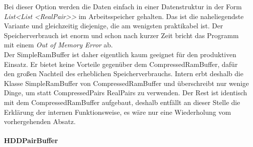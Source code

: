\documentclass[12pt,a4paper]{article}
\begin{document}
Bei dieser Option werden die Daten einfach in einer Datenstruktur in der Form \textit{List<List <RealPair>>} im Arbeitsspeicher gehalten. Das ist die naheliegendste Variante und gleichzeitig diejenige, die am wenigsten praktikabel ist. Der Speicherverbrauch ist enorm und schon nach kurzer Zeit bricht das Programm mit einem \textit{Out of Memory Error} ab. \\
Der SimpleRamBuffer ist daher eigentlich kaum geeignet für den produktiven Einsatz. Er bietet keine Vorteile gegenüber dem CompressedRamBuffer, dafür den großen Nachteil des erheblichen Speicherverbrauchs. Intern erbt deshalb die Klasse SimpleRamBuffer von CompressedRamBuffer und überschreibt nur wenige Dinge, um statt CompressedPairs RealPairs zu verwenden. Der Rest ist identisch mit dem CompressedRamBuffer aufgebaut, deshalb entfällt an dieser Stelle die Erklärung der internen Funktionsweise, es wäre nur eine Wiederholung vom vorhergehenden Absatz. \\



\paragraph{HDDPairBuffer} \mbox{}
\label{sec:hddBuffer}
\end{document}
